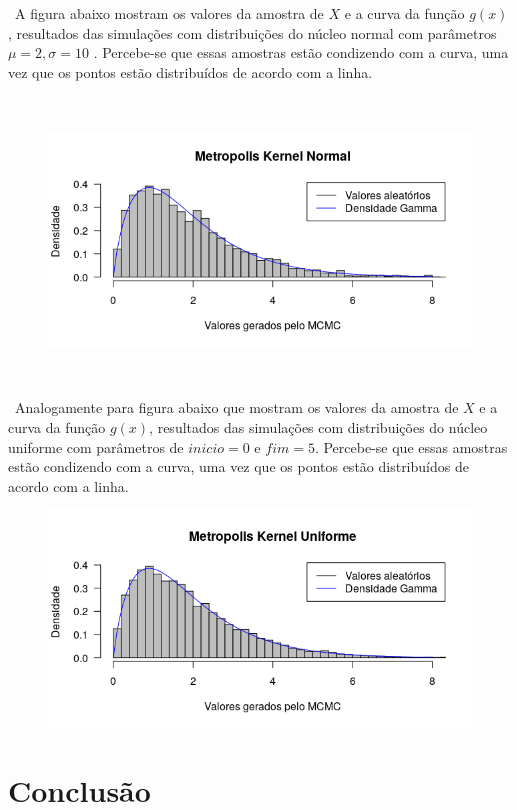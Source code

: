 \documentclass{article} %
\begin{document}
\ A figura abaixo mostram os valores da amostra de $X$ e a curva da função $g(x)$, resultados das simulações com distribuições do núcleo normal com parâmetros $ \mu = 2, \sigma = 10$ . Percebe-se que essas amostras estão condizendo com a curva, uma vez que os pontos estão distribuídos de acordo com a linha.

\ 

\begin{figure}[!htb]
\centering
\includegraphics[width = 15cm]{MKN.png}
\end{figure}

\

\ Analogamente para figura abaixo que mostram os valores da amostra de $X$ e a curva da função $g(x)$, resultados das simulações com distribuições do núcleo uniforme com parâmetros de $inicio = 0 $ e $fim = 5$. Percebe-se que essas amostras estão condizendo com a curva, uma vez que os pontos estão distribuídos de acordo com a linha.

\begin{figure}[!htb]
\centering
\includegraphics[width = 15cm]{MKU.png}
\end{figure}

\section{Conclusão}
\end{document}
